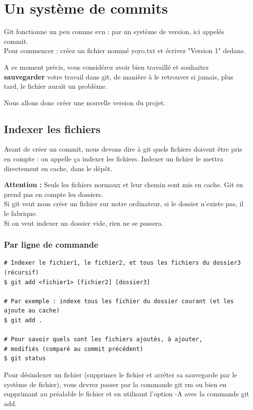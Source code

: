 \newpage
\section{Un système de commits}

Git fonctionne un peu comme svn : par un système de version, ici appelés commit.\\
Pour commencer : créez un fichier nommé yoyo.txt et écrivez "Version 1" dedans.

A ce moment précis, vous considérez avoir bien travaillé et souhaitez \textbf{sauvegarder} votre travail dans git, de manière à le retrouver si jamais, plus tard, le fichier aurait un problème.

Nous allons donc créer une nouvelle version du projet.

\subsection{Indexer les fichiers}
Avant de créer un commit, nous devons dire à git quels fichiers doivent être pris en compte :
on appelle ça indexer les fichiers.
Indexer un fichier le mettra directement en cache, dans le dépôt.

\textbf{Attention : } Seuls les fichiers normaux et leur chemin sont mis en cache. Git en prend pas en compte les dossiers.\\
Si git veut nous créer un fichier sur notre ordinateur, si le dossier n'existe pas, il le fabrique.\\
Si on veut indexer un dossier vide, rien ne se passera.

\subsubsection{Par ligne de commande}
\begin{verbatim}
# Indexer le fichier1, le fichier2, et tous les fichiers du dossier3 (récursif)
$ git add <fichier1> [fichier2] [dossier3]

# Par exemple : indexe tous les fichier du dossier courant (et les ajoute au cache)
$ git add .

# Pour savoir quels sont les fichiers ajoutés, à ajouter, 
# modifiés (comparé au commit précédent)
$ git status
\end{verbatim}

Pour désindexer un fichier (supprimer le fichier et arrêter sa sauvegarde par le système de fichier), vous devrez passer par la commande git rm ou bien en supprimant au préalable le fichier et en utilisant l'option -A avec la commande git add.\\

